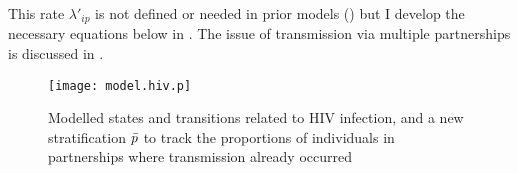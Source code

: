 This rate $\lambda'_{ip}$ is not defined or needed in prior models ()
but I develop the necessary equations below in .
The issue of transmission via multiple partnerships is discussed in .
\begin{figure}
  \centering\texttt{[image: model.hiv.p]}
  \caption{Modelled states and transitions related to HIV infection,
    and a new stratification $\bar{p}$ to track
    the proportions of individuals in partnerships where transmission already occurred}
  \label{fig:model.hiv.p}
\end{figure}
